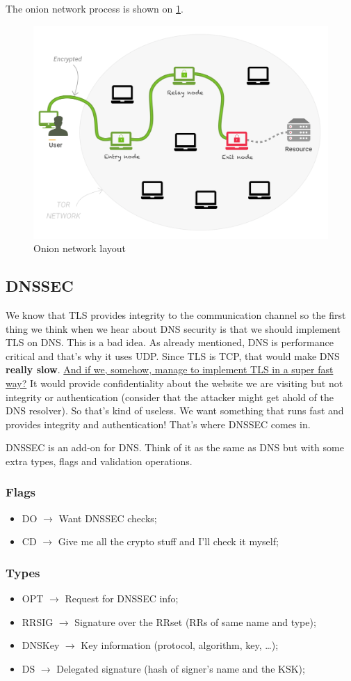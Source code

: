 \documentclass[11pt]{article}
\begin{document}
{The onion network process is shown on \ref{onion}.

\begin{figure}[htbp]
\centering
\includegraphics[height=0.5\textwidth]{res/onion.png}
\caption{\label{onion}
Onion network layout}
\end{figure}
\subsection{DNSSEC}
\label{sec:orgb108a06}
We know that TLS provides integrity to the communication channel so the first thing we think when we hear about DNS security is that we should implement TLS on DNS. This is a bad idea. As already mentioned, DNS is performance critical and that's why it uses UDP. Since TLS is TCP, that would make DNS \textbf{really slow}. \uline{And if we, somehow, manage to implement TLS in a super fast way?} It would provide confidentiality about the website we are visiting but not integrity or authentication (consider that the attacker might get ahold of the DNS resolver). So that's kind of useless. We want something that runs fast and provides integrity and authentication! That's where DNSSEC comes in.

DNSSEC is an add-on for DNS. Think of it as the same as DNS but with some extra types, flags and validation operations.
\subsubsection{Flags}
\label{sec:org12f70bf}
\begin{itemize}
\item DO \(\to\) Want DNSSEC checks;
\item CD \(\to\) Give me all the crypto stuff and I'll check it myself;
\end{itemize}
\subsubsection{Types}
\label{sec:orgfcba65e}
\begin{itemize}
\item OPT \(\to\) Request for DNSSEC info;
\item RRSIG \(\to\) Signature over the RRset (RRs of same name and type);
\item DNSKey \(\to\) Key information (protocol, algorithm, key, \ldots{});
\item DS \(\to\) Delegated signature (hash of signer's name and the KSK);
\end{itemize}
}
\end{document}
